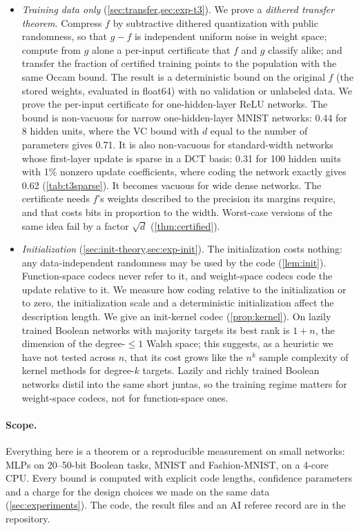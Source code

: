 \begin{itemize}
\item \emph{Training data only} (\cref{sec:transfer,sec:exp-t3}). We prove a \emph{dithered transfer theorem}. Compress $f$ by subtractive dithered quantization with public randomness, so that $g-f$ is independent uniform noise in weight space; compute from $g$ alone a per-input certificate that $f$ and $g$ classify alike; and transfer the fraction of certified training points to the population with the same Occam bound. The result is a deterministic bound on the original $f$ (the stored weights, evaluated in float64) with no validation or unlabeled data. We prove the per-input certificate for one-hidden-layer ReLU networks. The bound is non-vacuous for narrow one-hidden-layer MNIST networks: 0.44 for 8 hidden units, where the VC bound with $d$ equal to the number of parameters gives 0.71. It is also non-vacuous for standard-width networks whose first-layer update is sparse in a DCT basis: 0.31 for 100 hidden units with 1\% nonzero update coefficients, where coding the network exactly gives 0.62 (\cref{tab:t3sparse}). It becomes vacuous for wide dense networks. The certificate needs $f$'s weights described to the precision its margins require, and that costs bits in proportion to the width. Worst-case versions of the same idea fail by a factor $\sqrt d$ (\cref{thm:certified}).
\item \emph{Initialization} (\cref{sec:init-theory,sec:exp-init}). The initialization costs nothing: any data-independent randomness may be used by the code (\cref{lem:init}). Function-space codecs never refer to it, and weight-space codecs code the update relative to it. We measure how coding relative to the initialization or to zero, the initialization scale and a deterministic initialization affect the description length. We give an init-kernel codec (\cref{prop:kernel}). On lazily trained Boolean networks with majority targets its best rank is $1+n$, the dimension of the degree-$\le1$ Walsh space; this suggests, as a heuristic we have not tested across $n$, that its cost grows like the $n^k$ sample complexity of kernel methods for degree-$k$ targets. Lazily and richly trained Boolean networks distil into the same short juntas, so the training regime matters for weight-space codecs, not for function-space ones.
\end{itemize}



\paragraph{Scope.} Everything here is a theorem or a reproducible measurement on small networks: MLPs on 20--50-bit Boolean tasks, MNIST and Fashion-MNIST, on a 4-core CPU. Every bound is computed with explicit code lengths, confidence parameters and a charge for the design choices we made on the same data (\cref{sec:experiments}). The code, the result files and an AI referee record are in the repository.
